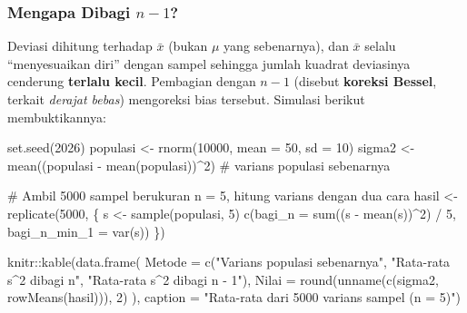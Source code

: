 \documentclass[
  indonesian,
  letterpaper,
]{book}
\newenvironment{Shaded}{\begin{snugshade}}{\end{snugshade}}
\newcommand{\AttributeTok}[1]{\textcolor[rgb]{0.40,0.45,0.13}{#1}}
\newcommand{\CommentTok}[1]{\textcolor[rgb]{0.37,0.37,0.37}{#1}}
\newcommand{\DecValTok}[1]{\textcolor[rgb]{0.68,0.00,0.00}{#1}}
\newcommand{\FunctionTok}[1]{\textcolor[rgb]{0.28,0.35,0.67}{#1}}
\newcommand{\NormalTok}[1]{\textcolor[rgb]{0.00,0.23,0.31}{#1}}
\newcommand{\OtherTok}[1]{\textcolor[rgb]{0.00,0.23,0.31}{#1}}
\newcommand{\SpecialCharTok}[1]{\textcolor[rgb]{0.37,0.37,0.37}{#1}}
\newcommand{\StringTok}[1]{\textcolor[rgb]{0.13,0.47,0.30}{#1}}
\begin{document}
\subsubsection{\texorpdfstring{Mengapa Dibagi
\(n-1\)?}{Mengapa Dibagi n-1?}}\label{mengapa-dibagi-n-1}

Deviasi dihitung terhadap \(\bar{x}\) (bukan \(\mu\) yang sebenarnya),
dan \(\bar{x}\) selalu ``menyesuaikan diri'' dengan sampel sehingga
jumlah kuadrat deviasinya cenderung \textbf{terlalu kecil}. Pembagian
dengan \(n-1\) (disebut \textbf{koreksi Bessel}, terkait \emph{derajat
bebas}) mengoreksi bias tersebut. Simulasi berikut membuktikannya:

\begin{Shaded}
\begin{Highlighting}[]
\FunctionTok{set.seed}\NormalTok{(}\DecValTok{2026}\NormalTok{)}
\NormalTok{populasi }\OtherTok{\textless{}{-}} \FunctionTok{rnorm}\NormalTok{(}\DecValTok{10000}\NormalTok{, }\AttributeTok{mean =} \DecValTok{50}\NormalTok{, }\AttributeTok{sd =} \DecValTok{10}\NormalTok{)}
\NormalTok{sigma2 }\OtherTok{\textless{}{-}} \FunctionTok{mean}\NormalTok{((populasi }\SpecialCharTok{{-}} \FunctionTok{mean}\NormalTok{(populasi))}\SpecialCharTok{\^{}}\DecValTok{2}\NormalTok{)   }\CommentTok{\# varians populasi sebenarnya}

\CommentTok{\# Ambil 5000 sampel berukuran n = 5, hitung varians dengan dua cara}
\NormalTok{hasil }\OtherTok{\textless{}{-}} \FunctionTok{replicate}\NormalTok{(}\DecValTok{5000}\NormalTok{, \{}
\NormalTok{s }\OtherTok{\textless{}{-}} \FunctionTok{sample}\NormalTok{(populasi, }\DecValTok{5}\NormalTok{)}
\FunctionTok{c}\NormalTok{(}\AttributeTok{bagi\_n =} \FunctionTok{sum}\NormalTok{((s }\SpecialCharTok{{-}} \FunctionTok{mean}\NormalTok{(s))}\SpecialCharTok{\^{}}\DecValTok{2}\NormalTok{) }\SpecialCharTok{/} \DecValTok{5}\NormalTok{, }\AttributeTok{bagi\_n\_min\_1 =} \FunctionTok{var}\NormalTok{(s))}
\NormalTok{\})}

\NormalTok{knitr}\SpecialCharTok{::}\FunctionTok{kable}\NormalTok{(}\FunctionTok{data.frame}\NormalTok{(}
\AttributeTok{Metode =} \FunctionTok{c}\NormalTok{(}\StringTok{"Varians populasi sebenarnya"}\NormalTok{, }\StringTok{"Rata{-}rata s\^{}2 dibagi n"}\NormalTok{, }\StringTok{"Rata{-}rata s\^{}2 dibagi n {-} 1"}\NormalTok{),}
\AttributeTok{Nilai =} \FunctionTok{round}\NormalTok{(}\FunctionTok{unname}\NormalTok{(}\FunctionTok{c}\NormalTok{(sigma2, }\FunctionTok{rowMeans}\NormalTok{(hasil))), }\DecValTok{2}\NormalTok{)}
\NormalTok{), }\AttributeTok{caption =} \StringTok{"Rata{-}rata dari 5000 varians sampel (n = 5)"}\NormalTok{)}
\end{Highlighting}
\end{Shaded}
\end{document}
